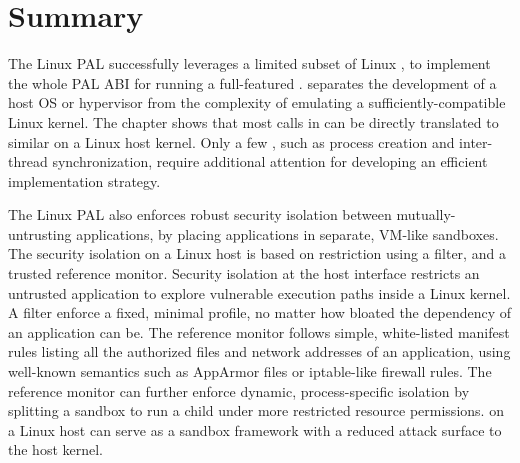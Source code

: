 \section{Summary}



The Linux PAL successfully leverages a limited subset of Linux \linuxapis{},
to implement the whole PAL ABI for running a
full-featured \libos{}.
\Thehostabi{} separates the development of a host OS or hypervisor
from the complexity of emulating a sufficiently-compatible
Linux kernel.
The chapter shows that most calls in \thehostabi{}
can be directly translated to similar \linuxapis{} on a Linux host kernel.
Only a few \hostapis{}, such as process creation and inter-thread synchronization, require additional attention for developing an efficient implementation strategy.



The Linux PAL also enforces robust security isolation
between mutually-untrusting applications,
by placing applications in separate, VM-like sandboxes.
The security isolation on a Linux host is based on \linuxapi{} restriction using a \seccomp{} filter, and a trusted reference monitor. %
Security isolation at the host interface
restricts an untrusted application to explore vulnerable execution paths
inside a Linux kernel.
A \seccomp{} filter 
enforce a fixed, minimal \linuxapi{} profile,
no matter how bloated the dependency of an application can be.
The reference monitor follows
simple, white-listed manifest rules listing 
all the authorized files and network addresses of an application,
using well-known semantics
such as AppArmor files or iptable-like firewall rules.
The reference monitor can further enforce dynamic, process-specific isolation by splitting a sandbox
to run a child \picoproc{} under more restricted
resource permissions.
\graphene{} on a Linux host can serve as a sandbox framework
with a reduced attack surface
to the host kernel.






